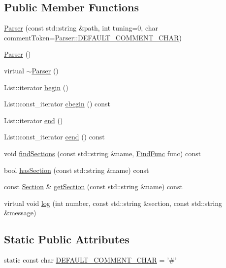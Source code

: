 \subsection*{Public Member Functions}
\begin{DoxyCompactItemize}
\item 
\hyperlink{a00048_ab7c33224b37afa414a66709fb08eef9b}{Parser} (const std\-::string \&path, int tuning=0, char comment\-Token=\hyperlink{a00048_a320f7053edb7ee8cf43ca21e5c734c3d}{Parser\-::\-D\-E\-F\-A\-U\-L\-T\-\_\-\-C\-O\-M\-M\-E\-N\-T\-\_\-\-C\-H\-A\-R})
\item 
\hyperlink{a00048_a1524c63d1be47dac077e9ff60ffd28cc}{Parser} ()
\item 
virtual \hyperlink{a00048_abd8140b071c5b2cba3209198b183150a}{$\sim$\-Parser} ()
\item 
List\-::iterator \hyperlink{a00048_a2c33c6f83a43072446465523e36439c6}{begin} ()
\item 
List\-::const\-\_\-iterator \hyperlink{a00048_a1b7960c2e788cc5132177a1c8819bd6f}{cbegin} () const 
\item 
List\-::iterator \hyperlink{a00048_a0dad9cfdcc11f9ea95869572ebd6a5a1}{end} ()
\item 
List\-::const\-\_\-iterator \hyperlink{a00048_ae195fb4c97b8e1b8e328a8c889c6f470}{cend} () const 
\item 
void \hyperlink{a00048_a5be35576da78523242f64603456dd79e}{find\-Sections} (const std\-::string \&name, \hyperlink{a00048_ae1acbe10817e492eff69dbc42c5483e8}{Find\-Func} func) const 
\item 
bool \hyperlink{a00048_afb7ff0bffa54c09350e6c324a278732f}{has\-Section} (const std\-::string \&name) const 
\item 
const \hyperlink{a00054}{Section} \& \hyperlink{a00048_a1a7a301f0bc2ff8fbc46e3499a100465}{get\-Section} (const std\-::string \&name) const 
\item 
virtual void \hyperlink{a00048_a21e022e851ad55fcde5059cd9451a334}{log} (int number, const std\-::string \&section, const std\-::string \&message)
\end{DoxyCompactItemize}
\subsection*{Static Public Attributes}
\begin{DoxyCompactItemize}
\item 
static const char \hyperlink{a00048_a320f7053edb7ee8cf43ca21e5c734c3d}{D\-E\-F\-A\-U\-L\-T\-\_\-\-C\-O\-M\-M\-E\-N\-T\-\_\-\-C\-H\-A\-R} = '\#'
\end{DoxyCompactItemize}
